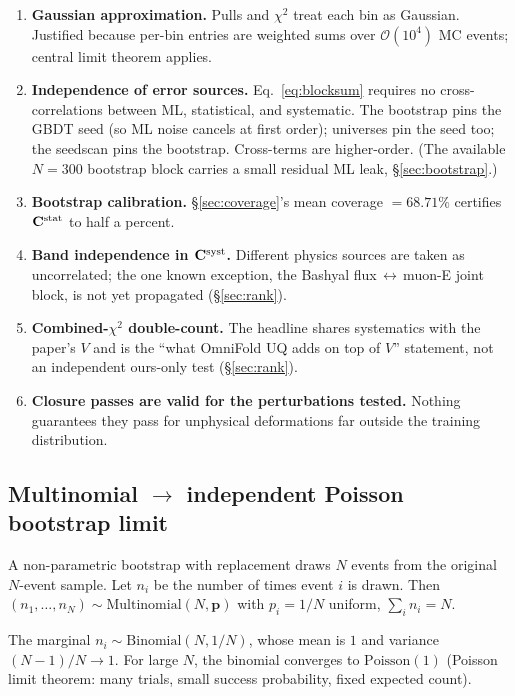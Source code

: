 \begin{enumerate}[nosep]
  \item \textbf{Gaussian approximation.} Pulls and $\chi^{2}$ treat
        each bin as Gaussian. Justified because per-bin entries are
        weighted sums over $\mathcal{O}(10^{4})$ MC events; central
        limit theorem applies.
  \item \textbf{Independence of error sources.}
        Eq.~\eqref{eq:blocksum} requires no cross-correlations between
        ML, statistical, and systematic. The bootstrap pins the GBDT
        seed (so ML noise cancels at first order); universes pin the
        seed too; the seedscan pins the bootstrap. Cross-terms are
        higher-order. (The available $N=300$ bootstrap block carries a
        small residual ML leak, \S\ref{sec:bootstrap}.)
  \item \textbf{Bootstrap calibration.} \S\ref{sec:coverage}'s mean
        coverage $= 68.71\%$ certifies $\mathbf{C}^{\text{stat}}$ to half a
        percent.
  \item \textbf{Band independence in $\mathbf{C}^{\text{syst}}$.}
        Different physics sources are taken as uncorrelated; the one
        known exception, the Bashyal flux\,$\leftrightarrow$\,muon-E
        joint block, is not yet propagated (\S\ref{sec:rank}).
  \item \textbf{Combined-$\chi^{2}$ double-count.} The headline shares
        systematics with the paper's $V$ and is the ``what OmniFold UQ
        adds on top of $V$'' statement, not an independent ours-only
        test (\S\ref{sec:rank}).
  \item \textbf{Closure passes are valid for the perturbations
        tested.} Nothing guarantees they pass for unphysical
        deformations far outside the training distribution.
\end{enumerate}


\subsection{Multinomial $\to$ independent Poisson bootstrap limit}
\label{app:poisson}

A non-parametric bootstrap with replacement draws $N$ events from the
original $N$-event sample. Let $n_{i}$ be the number of times event
$i$ is drawn. Then $(n_{1},\dots,n_{N}) \sim \mathrm{Multinomial}(N,
\mathbf{p})$ with $p_{i}=1/N$ uniform, $\sum_{i}n_{i}=N$.

The marginal $n_{i}\sim\mathrm{Binomial}(N,1/N)$, whose mean is $1$
and variance $(N-1)/N \to 1$. For large $N$, the binomial converges to
$\mathrm{Poisson}(1)$ (Poisson limit theorem: many trials, small
success probability, fixed expected count).

